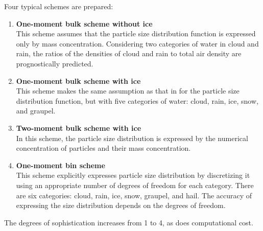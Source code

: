 Four typical schemes are prepared:
\begin{enumerate}
\item {\bf One-moment bulk scheme without ice \cite{kessler_1969}}\\ This scheme assumes that the particle size distribution function is expressed only by mass concentration. Considering two categories of water in cloud and rain, the ratios of the densities of cloud and rain to total air density are prognostically predicted.
\item {\bf One-moment bulk scheme with ice \cite{tomita_2008}}\\
This scheme makes the same assumption as that in \cite{kessler_1969} for the particle size distribution function, but with five categories of water: cloud, rain, ice, snow, and graupel.
\item {\bf Two-moment bulk scheme with ice \cite{sn_2014}}\\
In this scheme, the particle size distribution is expressed by the numerical concentration of particles and their mass concentration.
\item {\bf One-moment bin scheme \cite{suzuki_etal_2010}}\\
This scheme explicitly expresses particle size distribution by discretizing it using an appropriate number of degrees of freedom for each category. There are six categories: cloud, rain, ice, snow, graupel, and hail. The accuracy of expressing the size distribution depends on the degrees of freedom.

\end{enumerate}
The degrees of sophistication increases from 1 to 4, as does computational cost.

